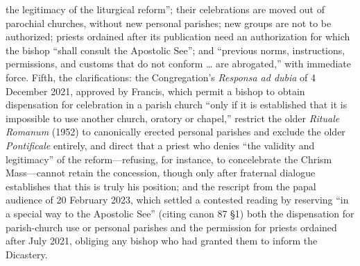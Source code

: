 the legitimacy of the liturgical reform''; their celebrations are moved out of parochial churches, without new personal parishes; new groups are not to be authorized; priests ordained after its publication need an authorization for which the bishop ``shall consult the Apostolic See''; and ``previous norms, instructions, permissions, and customs that do not conform \ldots{} are abrogated,'' with immediate force. Fifth, the clarifications: the Congregation's \emph{Responsa ad dubia} of 4 December 2021, approved by Francis, which permit a bishop to obtain dispensation for celebration in a parish church ``only if it is established that it is impossible to use another church, oratory or chapel,'' restrict the older \emph{Rituale Romanum} (1952) to canonically erected personal parishes and exclude the older \emph{Pontificale} entirely, and direct that a priest who denies ``the validity and legitimacy'' of the reform---refusing, for instance, to concelebrate the Chrism Mass---cannot retain the concession, though only after fraternal dialogue establishes that this is truly his position; and the rescript from the papal audience of 20 February 2023, which settled a contested reading by reserving ``in a special way to the Apostolic See'' (citing canon 87 \S1) both the dispensation for parish-church use or personal parishes and the permission for priests ordained after July 2021, obliging any bishop who had granted them to inform the Dicastery.

